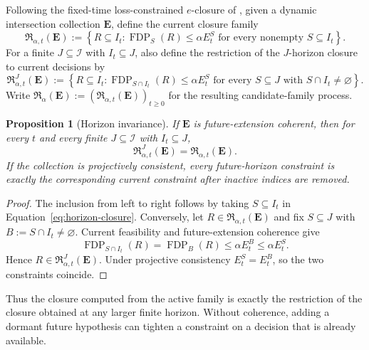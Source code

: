 \documentclass[11pt]{article}
\numberwithin{equation}{section}
\theoremstyle{plain}
\newtheorem{proposition}[theorem]{Proposition}
\theoremstyle{definition}
\newcommand{\Iuniv}{\mathcal I}
\newcommand{\Rfam}{\mathfrak R}
\newcommand{\FDP}{\operatorname{FDP}}
\begin{document}
Following the fixed-time loss-constrained $e$-closure of \citet{XuEtAl2026Closure}, given a dynamic intersection collection $\mathbf E$, define the current closure family
\begin{equation}\label{eq:dynamic-closure}
  \Rfam_{\alpha,t}(\mathbf E)
  :=\left\{R\subseteq I_t:
  \FDP_S(R)\leq\alpha E_t^S
  \text{ for every nonempty }S\subseteq I_t\right\}.
\end{equation}
For a finite $J\subseteq\Iuniv$ with $I_t\subseteq J$, also define the restriction of the $J$-horizon closure to current decisions by
\begin{equation}\label{eq:horizon-closure}
  \Rfam_{\alpha,t}^{J}(\mathbf E)
  :=\left\{R\subseteq I_t:
  \FDP_{S\cap I_t}(R)\leq\alpha E_t^S
  \text{ for every }S\subseteq J\text{ with }S\cap I_t\neq\varnothing\right\}.
\end{equation}
Write $\Rfam_\alpha(\mathbf E):=(\Rfam_{\alpha,t}(\mathbf E))_{t\geq0}$ for the resulting candidate-family process.

\begin{proposition}[Horizon invariance]\label{prop:horizon-invariance}
If $\mathbf E$ is future-extension coherent, then for every $t$ and every finite $J\subseteq\Iuniv$ with $I_t\subseteq J$,
\begin{equation}\label{eq:horizon-invariance}
  \Rfam_{\alpha,t}^{J}(\mathbf E)=\Rfam_{\alpha,t}(\mathbf E).
\end{equation}
If the collection is projectively consistent, every future-horizon constraint is exactly the corresponding current constraint after inactive indices are removed.
\end{proposition}

\begin{proof}
The inclusion from left to right follows by taking $S\subseteq I_t$ in Equation~\eqref{eq:horizon-closure}. Conversely, let $R\in\Rfam_{\alpha,t}(\mathbf E)$ and fix $S\subseteq J$ with $B:=S\cap I_t\neq\varnothing$. Current feasibility and future-extension coherence give
\[
  \FDP_{S\cap I_t}(R)=\FDP_B(R)
  \leq\alpha E_t^B\leq\alpha E_t^S.
\]
Hence $R\in\Rfam_{\alpha,t}^{J}(\mathbf E)$. Under projective consistency $E_t^S=E_t^B$, so the two constraints coincide.
\end{proof}

Thus the closure computed from the active family is exactly the restriction of the closure obtained at any larger finite horizon. Without coherence, adding a dormant future hypothesis can tighten a constraint on a decision that is already available.
\end{document}
